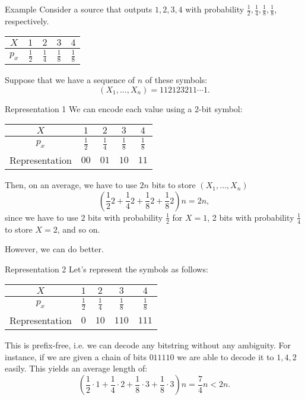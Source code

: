 \documentclass[a4paper]{article}
\begin{document}
\begin{parag}{Example}
    Consider a source that outputs $1, 2, 3, 4$ with probability $\frac{1}{2}, \frac{1}{4}, \frac{1}{8}, \frac{1}{8}$, respectively. 
    \begin{center}
    \begin{tabular}{c|cccc}
        $X$ & $1$ & $2$ & $3$ & $4$ \\ \hline
        $p_x$ & $\frac{1}{2}$ & $\frac{1}{4}$ & $\frac{1}{8}$ & $\frac{1}{8}$
    \end{tabular}
    \end{center}

    Suppose that we have a sequence of $n$ of these symbols:
    \[\left(X_1, \ldots, X_n\right) = 112123211\cdots1.\]
    
    \begin{subparag}{Representation 1}
        We can encode each value using a 2-bit symbol:
        \begin{center}
        \begin{tabular}{c|cccc}
            $X$ & $1$ & $2$ & $3$ & $4$ \\
            \hline
            $p_x$ & $\frac{1}{2}$ & $\frac{1}{4}$ & $\frac{1}{8}$ & $\frac{1}{8}$ \\
            Representation & $00$ & $01$ & $10$ & $11$
        \end{tabular}
        \end{center}
        
        Then, on an average, we have to use $2n$ bits to store $\left(X_1, \ldots, X_n\right)$ 
        \[\left(\frac{1}{2} 2 + \frac{1}{4} 2 + \frac{1}{8}2 + \frac{1}{8} 2\right) n = 2n,\]
        since we have to use $2$ bits with probability $\frac{1}{2}$ for $X = 1$, 2 bits with probability $\frac{1}{4}$ to store $X = 2$, and so on.

        However, we can do better.
    \end{subparag}

    \begin{subparag}{Representation 2}
        Let's represent the symbols as follows:
        \begin{center}
        \begin{tabular}{c|cccc}
            $X$ & $1$ & $2$ & $3$ & $4$ \\
            \hline
            $p_x$ & $\frac{1}{2}$ & $\frac{1}{4}$ & $\frac{1}{8}$ & $\frac{1}{8}$ \\
            Representation & $0$ & $10$ & $110$ & $111$
        \end{tabular}
        \end{center}
        
        This is prefix-free, i.e. we can decode any bitstring without any ambiguity. For instance, if we are given a chain of bits $011110$ we are able to decode it to $1, 4, 2$ easily. This yields an average length of: 
        \[\left(\frac{1}{2}\cdot 1 + \frac{1}{4}\cdot 2 + \frac{1}{8}\cdot 3 + \frac{1}{8}\cdot 3\right) n = \frac{7}{4}n < 2n.\]
    \end{subparag}
\end{parag}
\end{document}
